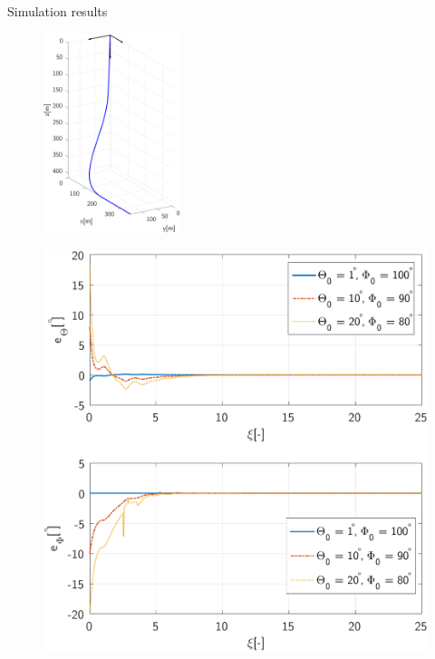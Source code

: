\documentclass[10pt]{beamer}
\begin{document}
\begin{frame}{Simulation results}
\begin{figure}[t]
	\centering
	\begin{minipage}[b]{0.5\textwidth}
		\centering
		\includegraphics[height=2.3in]{ReferenceTrajectory.pdf}
		\label{fig:ReferenceTrajectoryThetaPhi} 
	\end{minipage}
	\begin{minipage}[b]{0.45\textwidth}
		\centering
		\includegraphics[height=1.1\textwidth]{ErrorsNeutral.pdf}
		\label{fig:ReferenceTrajectoryV} 
	\end{minipage}
\end{figure}
\end{frame}
\end{document}
